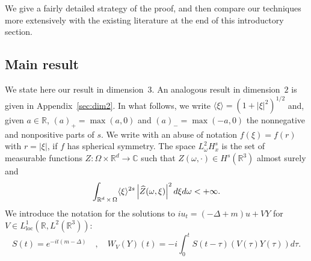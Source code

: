 \documentclass[10pt]{amsart}
\theoremstyle{definition}\newtheorem{defi}[theo]{Definition}\newtheorem{rema}[theo]{Remark}\newtheorem{exam}[theo]{Example}\newtheorem{exem}[theo]{Example}\newtheorem{nota}[theo]{Notation}
\newcommand{\R}{\mathbb{R}}
\newcommand{\C}{\mathbb{C}}
\newcommand{\loc}{\mathrm{loc}}
\let\oldhat\hat
\renewcommand*{\hat}[1]{\mathchoice{\widehat{#1}}{\widehat{#1}}{\oldhat{#1}}{\oldhat{#1}}}
\begin{document}
We give a fairly detailed strategy of the proof, and then compare our techniques more extensively with the existing literature at the end of this introductory section.



\subsection{Main result}

We state here our result in dimension~$3$. An analogous result in dimension~$2$ is given in Appendix~\ref{sec:dim2}. In what follows, we write $\langle \xi \rangle =(1+|\xi|^2)^{1/2}$ and, given $a\in \R$, $(a)_+=\max (a,0)$ and $(a)_-=\max (-a,0)$ the nonnegative and nonpositive parts of $s$. We write with an abuse of notation $f(\xi)=f(r)$ with $r=|\xi|$, if $f$ has spherical symmetry. The space $L^2_\omega H^{s}_x$ is the set of measurable functions $Z: \Omega \times \R^d \rightarrow \C$ such that $Z(\omega, \cdot)\in H^s(\R^3)$ almost surely and
\[
\int_{\R^d\,\times\,\Omega} \langle \xi \rangle^{2s} \left|\hat Z(\omega, \xi)\right|^2d\xi d \omega<+\infty.
\]
We introduce the notation for the solutions to $iu_t=(-\Delta +m)u+V Y$ for $V \in L^1_{\loc}(\R, L^2(\R^3)) $:
\begin{equation} \label{def:WV}
S(t) = e^{-it(m-\Delta)} \quad, \quad W_V(Y)(t) = -i\int_0^{t} S(t-\tau) (V(\tau) Y(\tau))d\tau.
\end{equation}
\end{document}
